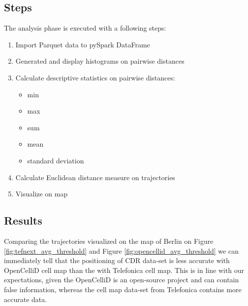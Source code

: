 \subsection{Steps}
The analysis phase is executed with a following steps:
\begin{enumerate}
    \item Import Parquet data to pySpark DataFrame
    \item Generated and display histograms on pairwise distances
    \item Calculate descriptive statistics on pairwise distances:
        \begin{itemize}
            \item min
            \item max
            \item sum
            \item mean
            \item standard deviation
        \end{itemize}
    \item Calculate Euclidean distance measure on trajectories
    \item Visualize on map
\end{enumerate}

\subsection{Results}

Comparing the trajectories visualized on the map of Berlin on Figure \ref{fig:tefnext_avg_threshold} and Figure \ref{fig:opencellid_avg_threshold} we can immediately tell that the positioning of CDR data-set is less accurate with OpenCelliD cell map than the with Telefonica cell map. This is in line with our expectations, given the OpenCelliD is an open-source project and can contain false information, whereas the cell map data-set from Telefonica contains more accurate data.

